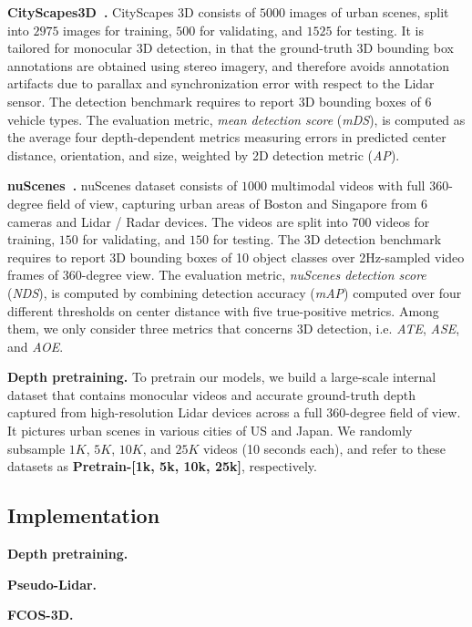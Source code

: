 \noindent\textbf{CityScapes3D~\cite{gahlert2020cityscapes}.} CityScapes 3D consists of $5000$ images of urban scenes, split into $2975$ images for training, $500$ for validating, and $1525$ for testing. It is tailored for monocular 3D detection, in that the ground-truth 3D bounding box annotations are obtained using stereo imagery, and therefore avoids annotation artifacts due to parallax and synchronization error with respect to the Lidar sensor. The detection benchmark requires to report 3D bounding boxes of 6 vehicle types. The evaluation metric, \emph{mean detection score} (\emph{mDS}), is computed as the average four depth-dependent metrics measuring errors in predicted center distance, orientation, and size, weighted by 2D detection metric (\emph{AP}).

\noindent\textbf{nuScenes~\cite{caesar2020nuscenes}.} nuScenes dataset consists of $1000$ multimodal videos with full $360$-degree field of view, capturing urban areas of Boston and Singapore from 6 cameras and Lidar / Radar devices. The videos are split into $700$ videos for training, $150$ for validating, and $150$ for testing. The 3D detection benchmark requires to report 3D bounding boxes of 10 object classes over 2Hz-sampled video frames of 360-degree view. The evaluation metric, \emph{nuScenes detection score} (\emph{NDS}), is computed by combining detection accuracy (\emph{mAP}) computed over four different thresholds on center distance with five true-positive metrics. Among them, we only consider three metrics that concerns 3D detection, i.e. \emph{ATE}, \emph{ASE}, and \emph{AOE}.

\noindent\textbf{Depth pretraining.} To pretrain our models, we build a large-scale internal dataset that contains monocular videos and accurate ground-truth depth captured from high-resolution Lidar devices across a full 360-degree field of view. It pictures urban scenes in various cities of US and Japan. We randomly subsample $1K$, $5K$, $10K$, and $25K$ videos (10 seconds each), and refer to these datasets as \textbf{Pretrain-[1k, 5k, 10k, 25k]}, respectively.

\subsection{Implementation}
\label{implementation}
\noindent\textbf{Depth pretraining.} 

\noindent\textbf{Pseudo-Lidar.}

\noindent\textbf{FCOS-3D.}

 

